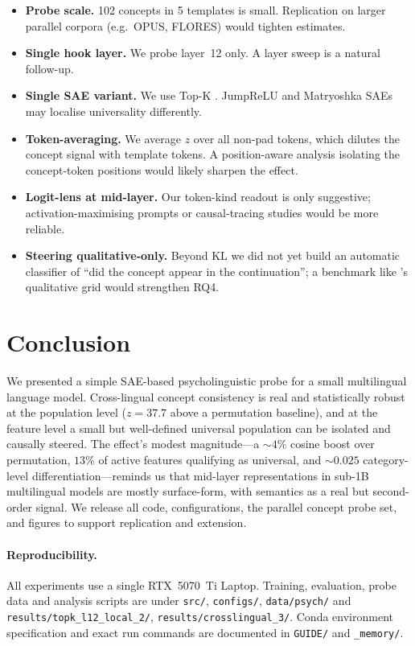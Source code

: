 \documentclass[11pt,a4paper]{article}
\begin{document}
\begin{itemize}
\item \textbf{Probe scale.} 102 concepts in 5 templates is small. Replication
on larger parallel corpora (e.g.\ OPUS, FLORES) would tighten estimates.
\item \textbf{Single hook layer.} We probe layer~12 only. A layer sweep is a
natural follow-up.
\item \textbf{Single SAE variant.} We use Top-K \cite{gao2024scalingsae}.
JumpReLU \cite{rajamanoharan2024jumprelu} and Matryoshka SAEs may localise
universality differently.
\item \textbf{Token-averaging.} We average $z$ over all non-pad tokens,
which dilutes the concept signal with template tokens. A position-aware
analysis isolating the concept-token positions would likely sharpen the
effect.
\item \textbf{Logit-lens at mid-layer.} Our token-kind readout is only
suggestive; activation-maximising prompts or causal-tracing studies would be
more reliable.
\item \textbf{Steering qualitative-only.} Beyond KL we did not yet build an
automatic classifier of ``did the concept appear in the continuation''; a
benchmark like \cite{templeton2024scalingmonosemanticity}'s qualitative grid
would strengthen RQ4.
\end{itemize}

\section{Conclusion}

We presented a simple SAE-based psycholinguistic probe for a small
multilingual language model. Cross-lingual concept consistency is real and
statistically robust at the population level ($z=37.7$ above a permutation
baseline), and at the feature level a small but well-defined universal
population can be isolated and causally steered. The effect's modest
magnitude---a $\sim 4\%$ cosine boost over permutation, $13\%$ of active
features qualifying as universal, and $\sim 0.025$ category-level
differentiation---reminds us that mid-layer representations in sub-1B
multilingual models are mostly surface-form, with semantics as a real but
second-order signal. We release all code, configurations, the parallel
concept probe set, and figures to support replication and extension.

\paragraph{Reproducibility.}
All experiments use a single RTX~5070~Ti Laptop. Training, evaluation,
probe data and analysis scripts are under
\texttt{src/}, \texttt{configs/}, \texttt{data/psych/} and
\texttt{results/topk\_l12\_local\_2/}, \texttt{results/crosslingual\_3/}.
Conda environment specification and exact run commands are documented in
\texttt{GUIDE/} and \texttt{\_memory/}.



\end{document}
